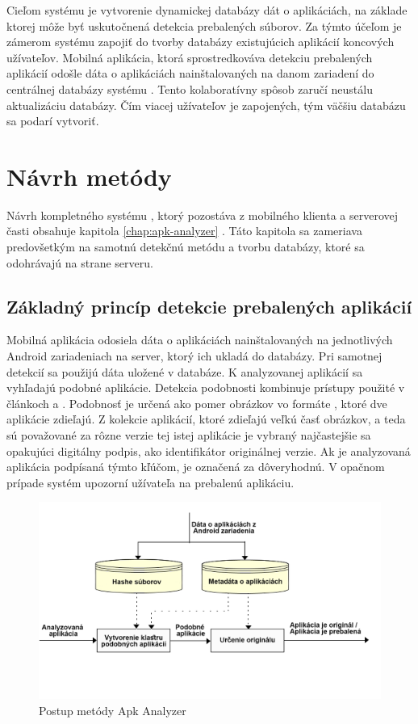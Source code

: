 Cieľom systému  je vytvorenie dynamickej databázy dát o aplikáciách, na základe ktorej môže byť uskutočnená detekcia prebalených súborov.
Za týmto účeľom je zámerom systému  zapojiť do tvorby databázy existujúcich aplikácií koncových užívateľov. Mobilná aplikácia, ktorá sprostredkováva detekciu prebalených aplikácií odošle dáta o aplikáciách nainštalovaných na danom zariadení do centrálnej databázy systému . Tento kolaboratívny spôsob zaručí neustálu aktualizáciu databázy. Čím viacej užívateľov je zapojených, tým väčšiu databázu sa podarí vytvoriť.

\section{Návrh metódy}
Návrh kompletného systému , ktorý pozostáva z mobilného klienta a serverovej časti obsahuje kapitola \ref{chap:apk-analyzer} . Táto kapitola sa zameriava predovšetkým na samotnú detekčnú metódu a tvorbu databázy, ktoré sa odohrávajú na strane serveru.

\subsection{Základný princíp detekcie prebalených aplikácií}
Mobilná aplikácia  odosiela dáta o aplikáciách nainštalovaných na jednotlivých Android zariadeniach na server, ktorý ich ukladá do databázy. Pri samotnej detekcií sa použijú dáta uložené v databáze. K analyzovanej aplikácií sa vyhľadajú podobné aplikácie. Detekcia podobnosti kombinuje prístupy použité v článkoch  a . Podobnosť je určená ako pomer obrázkov vo formáte , ktoré dve aplikácie zdieľajú. Z kolekcie aplikácií, ktoré zdieľajú veľkú časť obrázkov, a teda sú považované za rôzne verzie tej istej aplikácie je vybraný najčastejšie sa opakujúci digitálny podpis, ako identifikátor originálnej verzie. Ak je analyzovaná aplikácia podpísaná týmto kľúčom, je označená za dôveryhodnú. V opačnom prípade systém upozorní užívateľa na prebalenú aplikáciu. 

\begin{figure}[htb]
  \begin{center}
    \includegraphics[width=130mm]{images/detection-overview.png}
  \end{center}
  \caption{Postup metódy Apk Analyzer}
  \label{fig:metódaApkAnalyzer}
\end{figure}

